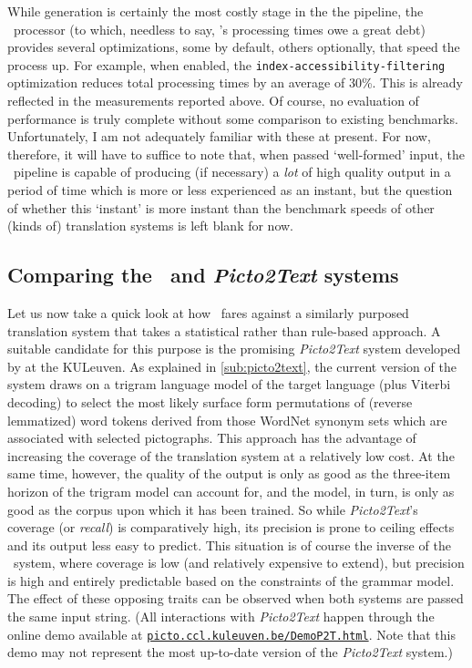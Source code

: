 While generation is certainly the most costly stage in the the pipeline, the
\ace\ processor (to which, needless to say, \depicto's processing times owe a
great debt) provides several optimizations, some by default, others optionally,
that speed the process up. For example, when enabled, the
\texttt{index-accessibility-filtering} optimization reduces total processing
times by an average of 30\%. This is already reflected in the measurements
reported above. Of course, no evaluation of performance is truly complete
without some comparison to existing benchmarks. Unfortunately, I am not
adequately familiar with these at present. For now, therefore, it will have to
suffice to note that, when passed `well-formed' input, the \depicto\ pipeline
is capable of producing (if necessary) a \emph{lot} of high quality output in a
period of time which is more or less experienced as an instant, but the
question of whether this `instant' is more instant than the benchmark speeds of
other (kinds of) translation systems is left blank for now.

\subsection{Comparing the \depicto\ and \emph{Picto2Text} systems}
\label{conc:eval:dep-v-p2t}

Let us now take a quick look at how \depicto\ fares against a similarly
purposed translation system that takes a statistical rather than rule-based
approach. A suitable candidate for this purpose is the promising
\emph{Picto2Text} system developed by \citet{sevens2015natural} at the
KULeuven. As explained in \cref{sub:picto2text}, the current version of the
system draws on a trigram language model of the target language (plus Viterbi
decoding) to select the most likely surface form permutations of (reverse
lemmatized) word tokens derived from those WordNet synonym sets which are
associated with selected pictographs. This approach has the advantage of
increasing the coverage of the translation system at a relatively low cost. At
the same time, however, the quality of the output is only as good as the
three-item horizon of the trigram model can account for, and the model, in
turn, is only as good as the corpus upon which it has been trained. So while
\emph{Picto2Text}'s coverage (or \emph{recall}) is comparatively high, its
precision is prone to ceiling effects and its output less easy to predict. This
situation is of course the inverse of the \depicto\ system, where coverage is
low (and relatively expensive to extend), but precision is high and entirely
predictable based on the constraints of the grammar model. The effect of these
opposing traits can be observed when both systems are passed the same input
string. (All interactions with \emph{Picto2Text} happen through the online demo
available at
\href{http://picto.ccl.kuleuven.be/DemoP2T.html}{\texttt{picto.ccl.kuleuven.be/DemoP2T.html}}.
Note that this demo may not represent the most up-to-date version of the
\emph{Picto2Text} system.)

